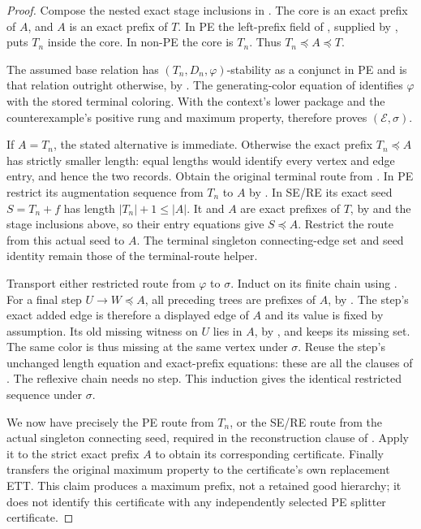 \begin{proof}
Compose the nested exact stage inclusions in
.  The core is an exact prefix of $A$, and
$A$ is an exact prefix of $T$.  In PE the left-prefix field of
, supplied by , puts
$T_n$ inside the core.  In non-PE the core is $T_n$.  Thus
$T_n\preccurlyeq A\preccurlyeq T$.

The assumed base relation has $(T_n,D_n,\varphi)$-stability as a conjunct
in PE and is that relation outright otherwise, by
.  The generating-color equation of
 identifies $\varphi$ with the stored
terminal coloring.  With the context's lower package and the
counterexample's positive rung and maximum property,
 therefore proves
$(\mathcal E,\sigma)$.

If $A=T_n$, the stated alternative is immediate.  Otherwise the exact
prefix $T_n\preccurlyeq A$ has strictly smaller length: equal lengths
would identify every vertex and edge entry, and hence the two
 records.  Obtain the original terminal route
from .
In PE restrict its augmentation sequence from $T_n$ to $A$ by
.
In SE/RE its exact seed $S=T_n+f$ has length $|T_n|+1\le |A|$.
It and $A$ are exact prefixes of $T$, by
 and the stage
inclusions above, so their entry equations give $S\preccurlyeq A$.
Restrict the route from this actual seed to $A$.
The terminal singleton connecting-edge set and seed identity remain
those of the terminal-route helper.

Transport either restricted route from $\varphi$ to $\sigma$.
Induct on its finite chain using .
For a final step $U\to W\preccurlyeq A$, all preceding trees are
prefixes of $A$, by
.
The step's exact added edge is therefore a displayed edge of $A$ and
its value is fixed by assumption.  Its old missing witness on $U$
lies in $A$, by ,
and keeps its missing set.  The same color is thus missing at the same
vertex under $\sigma$.  Reuse the step's unchanged length equation and
exact-prefix equations: these are all the clauses of
.  The reflexive chain needs no step.
This induction gives the identical restricted sequence under $\sigma$.

We now have precisely the PE route from $T_n$, or the SE/RE route from
the actual singleton connecting seed, required in the reconstruction
clause of .  Apply it to the strict exact prefix
$A$ to obtain its corresponding certificate.  Finally
 transfers the original maximum
property to the certificate's own replacement ETT.
This claim produces a maximum prefix, not a retained good hierarchy;
it does not identify this certificate with any independently selected
PE splitter certificate.
\end{proof}

